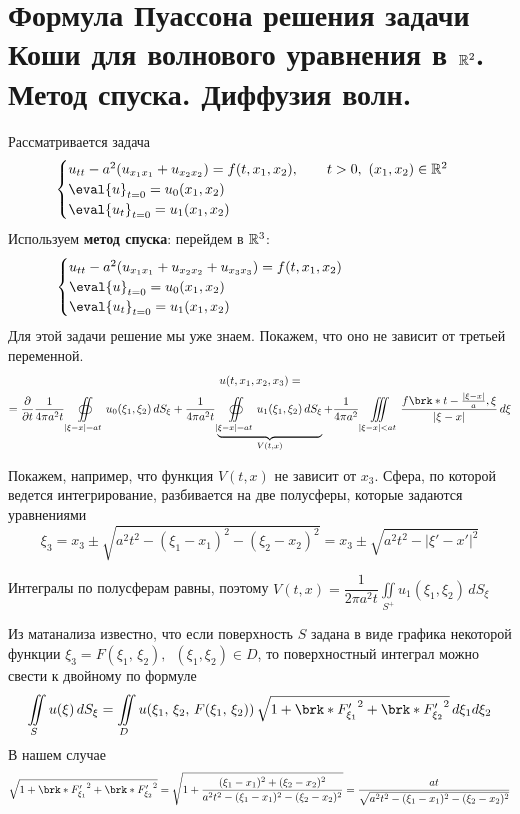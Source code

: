 \documentclass[../main.tex]{subfiles}
\begin{document}
\section[Волновое уравнение в \texorpdfstring{$\R^2$}{R\textasciicircum 2}]{Формула Пуассона решения задачи Коши для волнового уравнения в $\R^2$. Метод спуска. Диффузия волн.}
Рассматривается задача
\begin{equation}
\label{eq::7::cauchy}
\begin{cases}
  u_{tt}-a^2(u_{x_1x_1}+u_{x_2x_2})=f(t,x_1,x_2),\qquad t>0,\ (x_1, x_2)\in \R^2\\
  \eval{u}_{t=0}=u_0(x_1, x_2)\\ 
  \eval{u_t}_{t=0}=u_1(x_1, x_2)
\end{cases}
\end{equation}
Используем \textbf{метод спуска}: перейдем в $\mathbb{R}^3$:
\begin{equation*}
\begin{cases}
  u_{tt}-a^2(u_{x_1x_1}+u_{x_2x_2}+u_{x_3x_3})=f(t,x_1,x_2) \hspace{7.5em}\\
  \eval{u}_{t=0}=u_0(x_1, x_2)\\
  \eval{u_t}_{t=0}=u_1(x_1, x_2)
\end{cases}
\end{equation*}
Для этой задачи решение мы уже знаем. Покажем, что оно не зависит от третьей переменной.
\begin{multline*}
u(t, x_1, x_2, x_3) = \\
= \pd{}{t} \frac{1}{4\pi a^2t} \oiint\limits_{|\xi-x|=at} u_0(\xi_1, \xi_2)\, dS_\xi 
+\frac{1}{4\pi a^2t}\underbrace{\oiint\limits_{|\xi-x|=at} u_1(\xi_1, \xi_2)\, dS_{\xi}}_{V(t,x)}
+\frac{1}{4\pi a^2}\iiint\limits_{|\xi - x|<at}\frac{f \brk*{t-\frac{|\xi - x|}{a}, \xi} }{|\xi - x|}\, d\xi
\end{multline*}

Покажем, например, что функция $V(t,x)$ не зависит от $x_3$. Сфера, по которой ведется интегрирование, разбивается на две полусферы, которые задаются уравнениями
$$\xi_3=x_3\pm \sqrt{a^2t^2-(\xi_1 -x_1)^2-(\xi_2 -x_2)^2}=x_3\pm \sqrt{a^2t^2-|\xi '-x'|^2}$$

Интегралы по полусферам равны, поэтому $V(t,x)=\dfrac{1}{2\pi a^2t}\displaystyle\iint\limits_{S^+}u_1(\xi_1, \xi_2)\, dS_{\xi}$

Из матанализа известно, что если поверхность $S$ задана в виде графика некоторой функции $\xi_3=F(\xi_1,\, \xi_2),\;\ (\xi_1, \xi_2)\in D$, то поверхностный интеграл можно свести к двойному по формуле
\[
\iint\limits_S u(\xi )\, dS_{\xi}=\iint\limits_D u(\xi_1,\, \xi_2,\, F(\xi_1,\, \xi_2))\, 
\sqrt{1 + \brk*{F'_{\xi_1}}^2 + \brk*{F'_{\xi_2}}^2}\, d\xi_1 d\xi_2
\]
В нашем случае 
$$
\sqrt{1 + \brk*{F'_{\xi_1}}^2 + \brk*{F'_{\xi_2}}^2}
=\sqrt{1+\dfrac{(\xi_1 - x_1)^2+(\xi_2 - x_2)^2}{a^2t^2 - (\xi_1 - x_1)^2-(\xi_2 - x_2)^2}}
=\dfrac{at}{\sqrt{a^2t^2 - (\xi_1 - x_1)^2-(\xi_2 - x_2)^2}}$$
\end{document}
